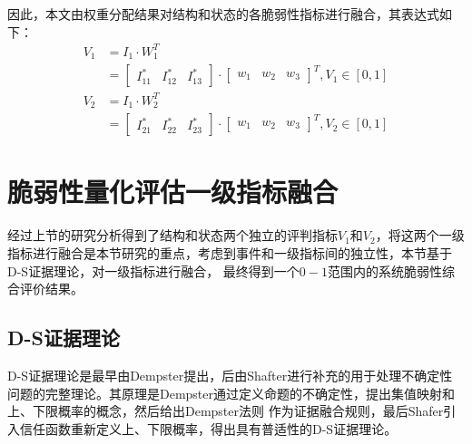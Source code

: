 因此，本文由权重分配结果对结构和状态的各脆弱性指标进行融合，其表达式如下：
\begin{equation}
\begin{aligned} V_{1} &=I_{1} \cdot W_1^{T} \\ &=\left[\begin{array}{lll}{I_{11}^{*}} & {I_{12}^{*}} & {I_{13}^{*}}\end{array}\right] \cdot\left[\begin{array}{lll}{w_{1}} & {w_{2}} & {w_{3}}\end{array}\right]^{T}, V_{1} \in[0,1] \end{aligned}
\end{equation}
\begin{equation}
\begin{aligned} V_{2} &=I_{1} \cdot W_2^{T} \\ &=\left[\begin{array}{lll}{I_{21}^{*}} & {I_{22}^{*}} & {I_{23}^{*}}\end{array}\right] \cdot\left[\begin{array}{lll}{w_{1}} & {w_{2}} & {w_{3}}\end{array}\right]^{T}, V_{2} \in[0,1] \end{aligned}
\end{equation}


\section{脆弱性量化评估一级指标融合}
\label{sec:DS}
经过上节的研究分析得到了结构和状态两个独立的评判指标$V_1$和$V_2$，将这两个一级指标进行融合是本节研究的重点，考虑到事件和一级指标间的独立性，本节基于D-S证据理论，对一级指标进行融合，
最终得到一个$0-1$范围内的系统脆弱性综合评价结果。

\subsection{D-S证据理论}
\label{sec:DStheory}
D-S证据理论是最早由Dempster提出，后由Shafter进行补充的用于处理不确定性问题的完整理论。其原理是Dempster通过定义命题的不确定性，提出集值映射和上、下限概率的概念，然后给出Dempster法则
作为证据融合规则，最后Shafer引入信任函数重新定义上、下限概率，得出具有普适性的D-S证据理论。

